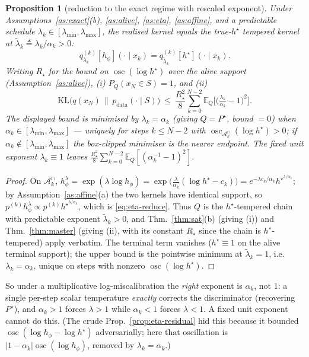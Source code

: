 \documentclass[11pt]{article}
\newcommand{\KL}{\mathrm{KL}}
\newcommand{\E}{\mathbb{E}}
\newcommand{\Aset}{\mathcal{A}}
\newcommand{\hs}{h^\star}
\DeclareMathOperator*{\osc}{osc}
\newcommand{\lmin}{\lambda_{\min}}
\newcommand{\lmax}{\lambda_{\max}}
\theoremstyle{plain}
\newtheorem{proposition}{Proposition}
\theoremstyle{definition}
\theoremstyle{remark}
\begin{document}
\begin{proposition}[reduction to the exact regime with rescaled exponent]
\label{prop:eta-reduction}
Under Assumptions~\ref{as:exact}(b), \ref{as:alive}, \ref{as:eta}, \ref{as:affine}, and a predictable
schedule $\lambda_k\in[\lmin,\lmax]$, the realised kernel equals the \emph{true}-$\hs$ tempered kernel at
$\tilde\lambda_k\triangleq\lambda_k/\alpha_k>0$:
\begin{equation}
\label{eq:eta-reduce}
q^{(k)}_{\lambda_k}[h_\phi](\cdot\mid x_k)=q^{(k)}_{\tilde\lambda_k}[\hs](\cdot\mid x_k).
\end{equation}
Writing $R_\star$ for the bound on $\osc(\log\hs)$ over the alive support (Assumption~\ref{as:alive}),
\textup{(i)} $P_Q(x_N\in S)=1$, and \textup{(ii)}
\[
\KL\!\big(q(x_N)\,\big\|\,p_{\text{data}}(\cdot\mid S)\big)
\ \le\ \frac{R_\star^2}{8}\sum_{k=0}^{N-2}\E_Q\Big[\big(\tfrac{\lambda_k}{\alpha_k}-1\big)^2\Big].
\]
The displayed bound is minimised by $\lambda_k=\alpha_k$ (giving $Q=P^\star$, bound $=0$) when
$\alpha_k\in[\lmin,\lmax]$ --- uniquely for steps $k\le N-2$ with $\osc_{\Aset^\cap_k}(\log\hs)>0$;
if $\alpha_k\notin[\lmin,\lmax]$ the box-clipped minimiser is the nearer endpoint. The fixed
unit exponent $\lambda_k\equiv1$ leaves $\tfrac{R_\star^2}{8}\sum_{k=0}^{N-2}\E_Q[(\alpha_k^{-1}-1)^2]$.
\end{proposition}
\begin{proof}
On $\Aset^\cap_k$, $h_\phi^{\lambda}=\exp(\lambda\log h_\phi)=\exp\!\big(\tfrac{\lambda}{\alpha_k}(\log\hs-c_k)\big)
=e^{-\lambda c_k/\alpha_k}\hs^{\lambda/\alpha_k}$; by Assumption~\ref{as:affine}(a) the two kernels
have identical support, so $p^{(k)}h_\phi^{\lambda}\propto p^{(k)}\hs^{\lambda/\alpha_k}$, which is
\eqref{eq:eta-reduce}. Thus $Q$ is the $\hs$-tempered chain with predictable exponent
$\tilde\lambda_k>0$, and Thm.~\ref{thm:sat}(b) (giving (i)) and Thm.~\ref{thm:master} (giving (ii),
with its constant $R_\star$ since the chain is $\hs$-tempered) apply verbatim. The terminal term
vanishes ($\hs\equiv1$ on the alive terminal support); the upper bound is the pointwise minimum
at $\tilde\lambda_k=1$, i.e.\ $\lambda_k=\alpha_k$, unique on steps with nonzero $\osc(\log\hs)$.
\end{proof}

So under a multiplicative log-miscalibration the \emph{right} exponent is $\alpha_k$, not $1$:
a single per-step scalar temperature \emph{exactly} corrects the discriminator (recovering
$P^\star$), and $\alpha_k>1$ forces $\lambda>1$ while $\alpha_k<1$ forces $\lambda<1$. A fixed
unit exponent cannot do this. (The crude Prop.~\ref{prop:eta-residual} hid this because it
bounded $\osc(\log h_\phi-\log\hs)$ adversarially; here that oscillation is $|1-\alpha_k|\osc(\log h_\phi)$,
removed by $\lambda_k=\alpha_k$.)
\end{document}
